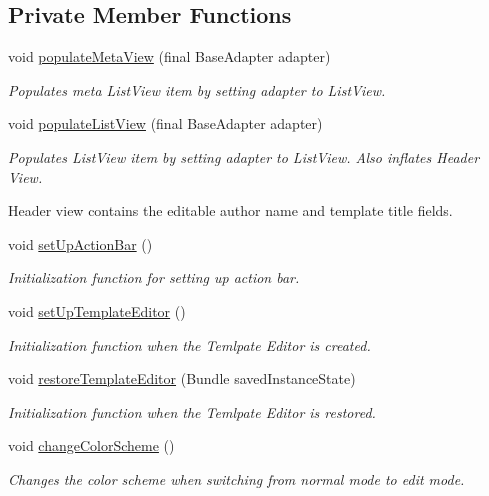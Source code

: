 \subsection*{Private Member Functions}
\begin{DoxyCompactItemize}
\item 
void \hyperlink{classorg_1_1buildmlearn_1_1toolkit_1_1activity_1_1TemplateEditor_a28dfa99f087a79031bde74c7b1804b26}{populate\+Meta\+View} (final Base\+Adapter adapter)
\begin{DoxyCompactList}\small\item\em Populates meta List\+View item by setting adapter to List\+View. \end{DoxyCompactList}\item 
void \hyperlink{classorg_1_1buildmlearn_1_1toolkit_1_1activity_1_1TemplateEditor_ade293345372081f3d43450df42e26092}{populate\+List\+View} (final Base\+Adapter adapter)
\begin{DoxyCompactList}\small\item\em Populates List\+View item by setting adapter to List\+View. Also inflates Header View. 

Header view contains the editable author name and template title fields. \end{DoxyCompactList}\item 
void \hyperlink{classorg_1_1buildmlearn_1_1toolkit_1_1activity_1_1TemplateEditor_a5bd38be8a926fff23a40e8014b71cb13}{set\+Up\+Action\+Bar} ()
\begin{DoxyCompactList}\small\item\em Initialization function for setting up action bar. \end{DoxyCompactList}\item 
void \hyperlink{classorg_1_1buildmlearn_1_1toolkit_1_1activity_1_1TemplateEditor_a064ac90668a94f32256938cb08fe896e}{set\+Up\+Template\+Editor} ()
\begin{DoxyCompactList}\small\item\em Initialization function when the Temlpate Editor is created. \end{DoxyCompactList}\item 
void \hyperlink{classorg_1_1buildmlearn_1_1toolkit_1_1activity_1_1TemplateEditor_a957831b300058bc26fbfc187517962a8}{restore\+Template\+Editor} (Bundle saved\+Instance\+State)
\begin{DoxyCompactList}\small\item\em Initialization function when the Temlpate Editor is restored. \end{DoxyCompactList}\item 
void \hyperlink{classorg_1_1buildmlearn_1_1toolkit_1_1activity_1_1TemplateEditor_a579696858455696ea2bac7bea2dccbd0}{change\+Color\+Scheme} ()
\begin{DoxyCompactList}\small\item\em Changes the color scheme when switching from normal mode to edit mode. 


\end{DoxyCompactList}
\end{DoxyCompactItemize}
